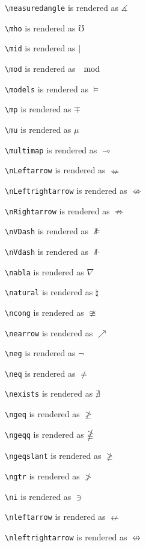 \texttt{\textbackslash measuredangle} is rendered as $\measuredangle$

\texttt{\textbackslash mho} is rendered as $\mho$

\texttt{\textbackslash mid} is rendered as $\mid$

\texttt{\textbackslash mod} is rendered as $\mod$

\texttt{\textbackslash models} is rendered as $\models$

\texttt{\textbackslash mp} is rendered as $\mp$

\texttt{\textbackslash mu} is rendered as $\mu$

\texttt{\textbackslash multimap} is rendered as $\multimap$

\texttt{\textbackslash nLeftarrow} is rendered as $\nLeftarrow$

\texttt{\textbackslash nLeftrightarrow} is rendered as $\nLeftrightarrow$

\texttt{\textbackslash nRightarrow} is rendered as $\nRightarrow$

\texttt{\textbackslash nVDash} is rendered as $\nVDash$

\texttt{\textbackslash nVdash} is rendered as $\nVdash$

\texttt{\textbackslash nabla} is rendered as $\nabla$

\texttt{\textbackslash natural} is rendered as $\natural$

\texttt{\textbackslash ncong} is rendered as $\ncong$

\texttt{\textbackslash nearrow} is rendered as $\nearrow$

\texttt{\textbackslash neg} is rendered as $\neg$

\texttt{\textbackslash neq} is rendered as $\neq$

\texttt{\textbackslash nexists} is rendered as $\nexists$

\texttt{\textbackslash ngeq} is rendered as $\ngeq$

\texttt{\textbackslash ngeqq} is rendered as $\ngeqq$

\texttt{\textbackslash ngeqslant} is rendered as $\ngeqslant$

\texttt{\textbackslash ngtr} is rendered as $\ngtr$

\texttt{\textbackslash ni} is rendered as $\ni$

\texttt{\textbackslash nleftarrow} is rendered as $\nleftarrow$

\texttt{\textbackslash nleftrightarrow} is rendered as $\nleftrightarrow$

